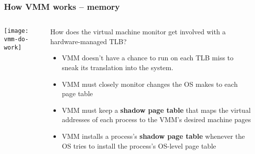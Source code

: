 \begin{frame}[plain]
	\frametitle{How VMM works -- memory}
	
	
	
	\begin{columns}
		
		\begin{column}{.4\textwidth}
			\centering
			\texttt{[image: vmm-do-work]}
			
		\end{column}
		
		\begin{column}{.6\textwidth}
			
			How does the virtual machine monitor get involved with a
			hardware-managed TLB?	
			
			\begin{itemize}
				\item VMM doesn't have a chance to run on each TLB miss to sneak its translation into the system. 
				\item VMM must closely monitor changes	the OS makes to each page table
				\item VMM must keep a \textbf{shadow page table} that maps the virtual addresses of each process to the VMM's desired machine pages
				\item VMM installs a process's \textbf{shadow page table }whenever the OS tries to install the process's	OS-level page table
				
			\end{itemize} 
			
			
			
		\end{column}
		
		
	\end{columns}
	
	
\end{frame}


